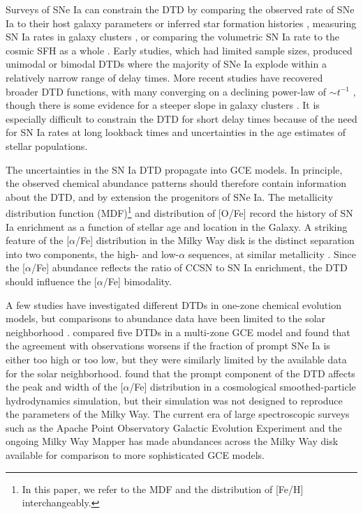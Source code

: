 \documentclass[twocolumn,twocolappendix,linenumbers]{aastex631}
\newcommand{\aFe}{[$\alpha$/Fe]\xspace}
\begin{document}
Surveys of SNe Ia can constrain the DTD by comparing the observed rate of SNe Ia to their host galaxy parameters \citep[e.g.,][]{Mannucci2005-SNRate,Heringer2019-FieldGalaxyDTD} or inferred star formation histories \citep[SFHs; e.g.,][]{Maoz2012-SloanIIDTD}, measuring SN Ia rates in galaxy clusters \citep[e.g.,][]{Maoz2010-ClusterDTD}, or comparing the volumetric SN Ia rate to the cosmic SFH as a whole \citep[e.g.,][]{Graur2014-VolumetricSNIaRates,Strolger2020-ExponentialDTD}. Early studies, which had limited sample sizes, produced unimodal \citep{Strolger2004-SNIaProgenitors} or bimodal \citep{Mannucci2006-TwoPopulations} DTDs where the majority of SNe Ia explode within a relatively narrow range of delay times. More recent studies have recovered broader DTD functions, with many converging on a declining power-law of $\sim t^{-1}$ \citep[e.g.,][]{Maoz2017-CosmicDTD,Castrillo2021-DTD,Wiseman2021-DESRates}, though there is some evidence for a steeper slope in galaxy clusters \citep{Maoz2017-CosmicDTD,FriedmannMaoz2018-ClusterDTD}. It is especially difficult to constrain the DTD for short delay times \citep{MaozMannucci2012-SNeIaReview} because of the need for SN Ia rates at long lookback times and uncertainties in the age estimates of stellar populations.

The uncertainties in the SN Ia DTD propagate into GCE models. In principle, the observed chemical abundance patterns should therefore contain information about the DTD, and by extension the progenitors of SNe Ia. The metallicity distribution function (MDF)\footnote{In this paper, we refer to the MDF and the distribution of [Fe/H] interchangeably.} and distribution of [O/Fe] record the history of SN Ia enrichment as a function of stellar age and location in the Galaxy. A striking feature of the \aFe distribution in the Milky Way disk is the distinct separation into two components, the high- and low-$\alpha$ sequences, at similar metallicity \citep[e.g.,][]{Bensby2014-solarNeighborhoodAbundances}. Since the \aFe abundance reflects the ratio of CCSN to SN Ia enrichment, the DTD should influence the \aFe bimodality.

A few studies have investigated different DTDs in one-zone chemical evolution models, but comparisons to abundance data have been limited to the solar neighborhood \citep[e.g.,][]{Andrews2017-ChemicalEvolution,Palicio2023-AnalyticDTD}. \citet{Matteucci2009-DTDModels} compared five DTDs in a multi-zone GCE model and found that the agreement with observations worsens if the fraction of prompt SNe Ia is either too high or too low, but they were similarly limited by the available data for the solar neighborhood. \citet{Poulhazan2018-PrecisionPollution} found that the prompt component of the DTD affects the peak and width of the \aFe distribution in a cosmological smoothed-particle hydrodynamics simulation, but their simulation was not designed to reproduce the parameters of the Milky Way. The current era of large spectroscopic surveys such as the Apache Point Observatory Galactic Evolution Experiment \citep[APOGEE;][]{Majewski2017-APOGEE} and the ongoing Milky Way Mapper \citep{Kollmeier2017-SDSS-V} has made abundances across the Milky Way disk available for comparison to more sophisticated GCE models.
\end{document}

